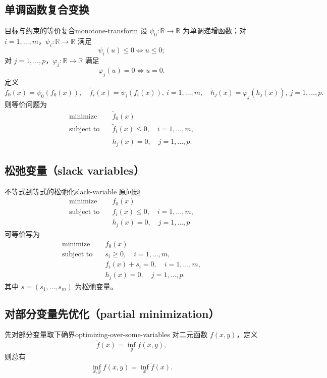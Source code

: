 \documentclass[11pt,a4paper]{article}
\begin{document}
\subsection{单调函数复合变换}
\begin{definition}{目标与约束的等价复合}{monotone-transform}
设 $\psi_0:\mathbb R\to\mathbb R$ 为单调递增函数；对 $i=1,\dots,m$，$\psi_i:\mathbb R\to\mathbb R$ 满足
\[
\psi_i(u)\le0\iff u\le0;
\]
对 $j=1,\dots,p$，$\varphi_j:\mathbb R\to\mathbb R$ 满足
\[
\varphi_j(u)=0\iff u=0.
\]
定义
\[
\tilde f_0(x)=\psi_0(f_0(x)),\quad
\tilde f_i(x)=\psi_i(f_i(x)),\ i=1,\dots,m,\quad
\tilde h_j(x)=\varphi_j(h_j(x)),\ j=1,\dots,p.
\]
则等价问题为
\[
\begin{aligned}
\text{minimize}\quad & \tilde f_0(x)\\
\text{subject to}\quad & \tilde f_i(x)\le0,\quad i=1,\dots,m,\\
& \tilde h_j(x)=0,\quad j=1,\dots,p.
\end{aligned}
\]
\end{definition}

\subsection{松弛变量（slack variables）}
\begin{definition}{不等式到等式的松弛化}{slack-variable}
原问题
\[
\begin{aligned}
\text{minimize}\quad & f_0(x)\\
\text{subject to}\quad & f_i(x)\le0,\quad i=1,\dots,m,\\
& h_j(x)=0,\quad j=1,\dots,p
\end{aligned}
\]
可等价写为
\[
\begin{aligned}
\text{minimize}\quad & f_0(x)\\
\text{subject to}\quad & s_i\ge0,\quad i=1,\dots,m,\\
& f_i(x)+s_i=0,\quad i=1,\dots,m,\\
& h_j(x)=0,\quad j=1,\dots,p.
\end{aligned}
\]
其中 $s=(s_1,\dots,s_m)$ 为松弛变量。
\end{definition}

\subsection{对部分变量先优化（partial minimization）}
\begin{definition}{先对部分变量取下确界}{optimizing-over-some-variables}
对二元函数 $f(x,y)$，定义
\[
\tilde f(x)=\inf_y f(x,y),
\]
则总有
\[
\inf_{x,y} f(x,y)=\inf_x \tilde f(x).
\]
\end{definition}
\end{document}
